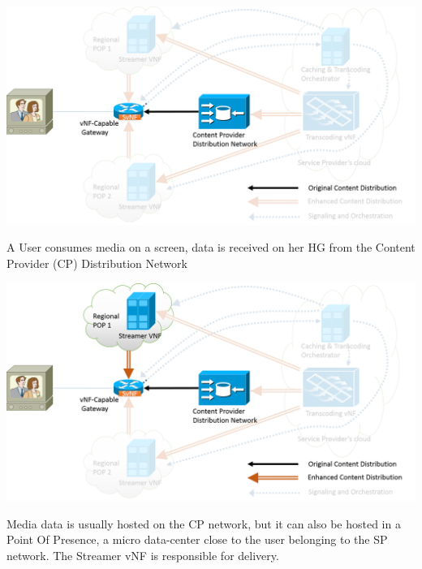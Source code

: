 \documentclass[a4paper]{beamer}
\begin{document}
\begin{frame}{}
	\centering
	\includegraphics[width=0.95\linewidth]{highleveldesign1.png}
	\vspace{2em}
	\begin{block}{}
		A User consumes media on a screen, data is received on her HG from the Content Provider (CP) Distribution Network
	\end{block}
	
\end{frame}

\begin{frame}{}
	\centering
	\includegraphics[width=0.95\linewidth]{highleveldesign2.png}
	\vspace{1em}
	\begin{block}{}
		Media data is usually hosted on the CP network, but it can also be hosted in a Point Of Presence, a micro data-center close to the user belonging to the SP network. The Streamer vNF is responsible for delivery.
	\end{block}
\end{frame}
\end{document}
